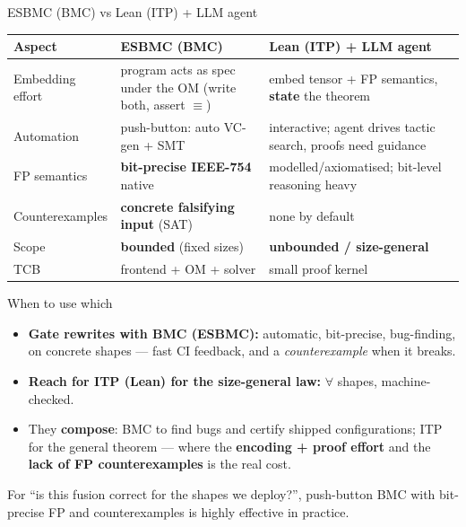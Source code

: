 \documentclass[aspectratio=169,11pt]{beamer}
\begin{document}
\begin{frame}{ESBMC (BMC) vs Lean (ITP) {+} LLM agent}
  \small
  \begin{tabular}{@{}p{} p{} p{}@{}}
    \toprule
    \textbf{Aspect} & \textbf{ESBMC (BMC)} & \textbf{Lean (ITP) + LLM agent} \\
    \midrule
    Embedding effort & program acts as spec under the OM (write both, assert $\equiv$) & embed tensor {+} FP semantics, \textbf{state} the theorem \\
    Automation & push-button: auto VC-gen {+} SMT & interactive; agent drives tactic search, proofs need guidance \\
    FP semantics & \textbf{bit-precise IEEE-754} native & modelled/axiomatised; bit-level reasoning heavy \\
    Counterexamples & \textbf{concrete falsifying input} (SAT) & none by default \\
    Scope & \textbf{bounded} (fixed sizes) & \textbf{unbounded / size-general} \\
    TCB & frontend {+} OM {+} solver & small proof kernel \\
    \bottomrule
  \end{tabular}
\end{frame}

\begin{frame}{When to use which}
  \begin{itemize}
    \item \textbf{Gate rewrites with BMC (ESBMC):} automatic, bit-precise, bug-finding, on concrete
      shapes --- fast CI feedback, and a \emph{counterexample} when it breaks.
    \item \textbf{Reach for ITP (Lean) for the size-general law:} $\forall$ shapes, machine-checked.
    \item They \textbf{compose}: BMC to find bugs and certify shipped configurations; ITP for the
      general theorem --- where the \textbf{encoding + proof effort} and the \textbf{lack of FP
      counterexamples} is the real cost.
  \end{itemize}
  \begin{block}{}
    For ``is this fusion correct for the shapes we deploy?'', push-button BMC with bit-precise FP
    and counterexamples is highly effective in practice.
  \end{block}
\end{frame}
\end{document}
